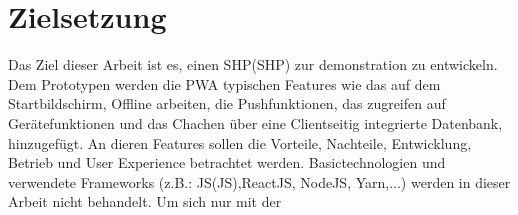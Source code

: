 \newpage
\section{Zielsetzung}\label{sub:Zielsetzung}
Das Ziel dieser Arbeit ist es, einen \acl{SHP}(\acs{SHP}) zur demonstration zu entwickeln. 
Dem Prototypen werden die \acs{PWA} typischen Features wie das auf dem Startbildschirm, Offline arbeiten, die Pushfunktionen, 
das zugreifen auf Gerätefunktionen und das Chachen über eine Clientseitig integrierte Datenbank, hinzugefügt. 
An dieren Features sollen die Vorteile, Nachteile, Entwicklung, Betrieb und User Experience betrachtet werden.
Basictechnologien und verwendete Frameworks (z.B.: \acl{JS}(\acs{JS}),ReactJS, NodeJS, Yarn,...) werden in dieser Arbeit nicht behandelt.
Um sich nur mit der 